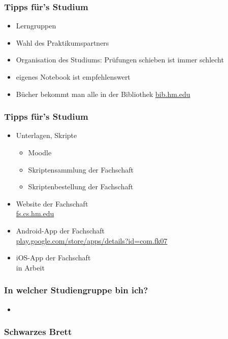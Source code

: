 \documentclass{beamer}
\begin{document}
     \begin{frame}[t]
     	\frametitle{Tipps für's Studium}
     	\begin{itemize}
     		\item Lerngruppen
     		\pause
     		\item Wahl des Praktikumspartners
     		\pause
     		\item Organisation des Studiums: Prüfungen schieben ist immer schlecht
     		\pause
     		\item eigenes Notebook ist empfehlenswert
     		\pause
     		\item Bücher bekommt man alle in der Bibliothek \url{bib.hm.edu}
     	\end{itemize}
     \end{frame}
     
     \begin{frame}[t]
     	\frametitle{Tipps für's Studium}
     	\begin{itemize}
     		\item Unterlagen, Skripte 
     		\begin{itemize}
     			\item Moodle
     			\item Skriptensammlung der Fachschaft
     			\item Skriptenbestellung der Fachschaft
     		\end{itemize}
     		\pause
     		\item Website der Fachschaft\\ \url{fs.cs.hm.edu}
     		\pause
     		\item Android-App der Fachschaft\\ \url{play.google.com/store/apps/details?id=com.fk07}
     		\pause
     		\item iOS-App der Fachschaft\\
     		in Arbeit	
     	\end{itemize}
     \end{frame}
     
     \begin{frame}[t]
     	\frametitle{In welcher Studiengruppe bin ich?}
     	\begin{itemize}
     		\item
     	\end{itemize}
     \end{frame}
     
     \begin{frame}
     	\frametitle{Schwarzes Brett}
     \end{frame}
    
    
    
\end{document}
